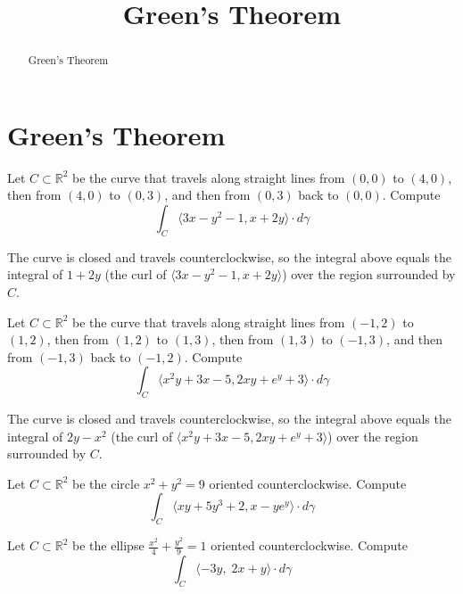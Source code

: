 \documentclass{ximera}
\title{Green's Theorem}
\begin{document}
\begin{abstract}
    Green's Theorem
\end{abstract}


\section{Green's Theorem}
\begin{exercise}
    Let $C \subset \mathbb{R}^2$ be the curve that travels along straight lines from $(0,0)$ to $(4,0)$,  then from $(4,0) $ to $(0,3)$, and then from $(0,3)$ back to $(0,0)$. Compute
    \[
        \int_C \langle  3x-y^2  - 1 , x + 2y \rangle \cdot  d \gamma 
    \]
    
    \begin{hint}
    The curve is closed and travels counterclockwise, so the integral above equals the integral of $1 + 2 y $ (the curl of $\langle  3x-y^2  - 1 , x + 2y \rangle$) over the region surrounded by $C$. 
\end{hint}
\end{exercise}

\begin{exercise}
    Let $C \subset \mathbb{R}^2$ be the curve that travels along straight lines from $(-1,2)$ to $(1,2)$,  then from $(1,2) $ to $(1,3)$, then from $(1,3) $ to $(-1,3)$, and then from $(-1,3)$ back to $(-1,2)$. Compute
    \[
        \int_C \langle x^2 y + 3x - 5, 2xy + e^y + 3 \rangle \cdot  d \gamma 
    \]
    
    \begin{hint}
    The curve is closed and travels counterclockwise, so the integral above equals the integral of $ 2y - x^2 $ (the curl of $\langle  x^2 y + 3x - 5, 2xy + e^y + 3 \rangle$) over the region surrounded by $C$. 
\end{hint}
\end{exercise}

\begin{exercise}
    Let $C \subset \mathbb{R}^2$ be the circle $x^2 + y^2 = 9$ oriented counterclockwise. Compute
    \[
        \int_C \langle xy + 5y^3 + 2 , x - y e ^y  \rangle \cdot  d \gamma 
    \]
\end{exercise}

\begin{exercise}
    Let $C \subset \mathbb{R}^2$ be the ellipse $\frac{x^2}{4} + \frac{y^2}{9} = 1$ oriented counterclockwise. Compute
    \[
        \int_C \langle -3y,\; 2x + y \rangle \cdot  d \gamma 
    \]
\end{exercise}
\end{document}
